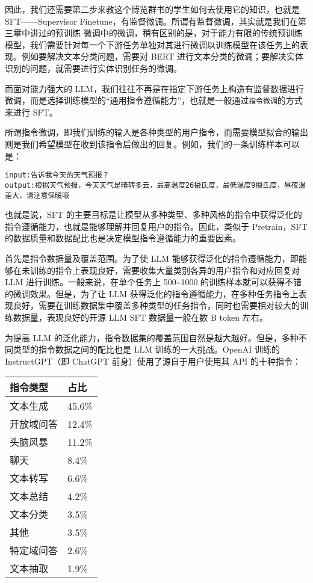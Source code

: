 \documentclass[
]{article}
\begin{document}
因此，我们还需要第二步来教这个博览群书的学生如何去使用它的知识，也就是
SFT------Supervisor
Finetune，有监督微调。所谓有监督微调，其实就是我们在第三章中讲过的预训练-微调中的微调，稍有区别的是，对于能力有限的传统预训练模型，我们需要针对每一个下游任务单独对其进行微调以训练模型在该任务上的表现。例如要解决文本分类问题，需要对
BERT
进行文本分类的微调；要解决实体识别的问题，就需要进行实体识别任务的微调。

而面对能力强大的
LLM，我们往往不再是在指定下游任务上构造有监督数据进行微调，而是选择训练模型的``通用指令遵循能力''，也就是一般通过\texttt{指令微调}的方式来进行
SFT。

所谓指令微调，即我们训练的输入是各种类型的用户指令，而需要模型拟合的输出则是我们希望模型在收到该指令后做出的回复。例如，我们的一条训练样本可以是：

\begin{verbatim}
input:告诉我今天的天气预报？
output:根据天气预报，今天天气是晴转多云，最高温度26摄氏度，最低温度9摄氏度，昼夜温差大，请注意保暖哦
\end{verbatim}

也就是说，SFT
的主要目标是让模型从多种类型、多种风格的指令中获得泛化的指令遵循能力，也就是能够理解并回复用户的指令。因此，类似于
Pretrain，SFT 的数据质量和数据配比也是决定模型指令遵循能力的重要因素。

首先是指令数据量及覆盖范围。为了使 LLM
能够获得泛化的指令遵循能力，即能够在未训练的指令上表现良好，需要收集大量类别各异的用户指令和对应回复对
LLM 进行训练。一般来说，在单个任务上 500\textasciitilde1000
的训练样本就可以获得不错的微调效果。但是，为了让 LLM
获得泛化的指令遵循能力，在多种任务指令上表现良好，需要在训练数据集中覆盖多种类型的任务指令，同时也需要相对较大的训练数据量，表现良好的开源
LLM SFT 数据量一般在数 B token 左右。

为提高 LLM
的泛化能力，指令数据集的覆盖范围自然是越大越好。但是，多种不同类型的指令数据之间的配比也是
LLM 训练的一大挑战。OpenAI 训练的 InstructGPT（即 ChatGPT
前身）使用了源自于用户使用其 API 的十种指令：

\begin{longtable}[]{@{}ll@{}}
\toprule\noalign{}
指令类型 & 占比 \\
\midrule\noalign{}
\endhead
\bottomrule\noalign{}
\endlastfoot
文本生成 & 45.6\% \\
开放域问答 & 12.4\% \\
头脑风暴 & 11.2\% \\
聊天 & 8.4\% \\
文本转写 & 6.6\% \\
文本总结 & 4.2\% \\
文本分类 & 3.5\% \\
其他 & 3.5\% \\
特定域问答 & 2.6\% \\
文本抽取 & 1.9\% \\
\end{longtable}
\end{document}
